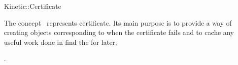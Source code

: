 

\begin{ccRefConcept}{Kinetic::Certificate}


\ccDefinition
  
The concept \ccClassName\ represents certificate. Its main purpose is
to provide a way of creating  objects corresponding to when
the certificate fails and to cache any useful work done in find the
 for later.

\ccOperations






\ccSeeAlso

.

\end{ccRefConcept}


